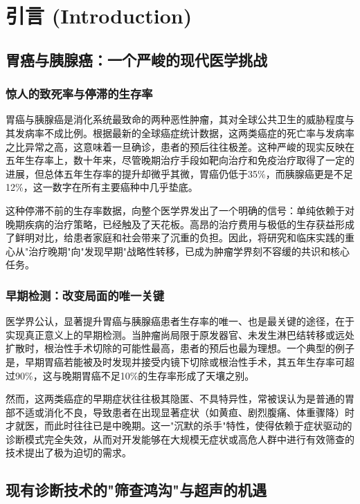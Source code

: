 
\chapter{引言 (Introduction)} \label{chp:intro}

\section{胃癌与胰腺癌：一个严峻的现代医学挑战}

\subsection{惊人的致死率与停滞的生存率}

胃癌与胰腺癌是消化系统最致命的两种恶性肿瘤，其对全球公共卫生的威胁程度与其发病率不成比例。根据最新的全球癌症统计数据，这两类癌症的死亡率与发病率之比异常之高，这意味着一旦确诊，患者的预后往往极差。这种严峻的现实反映在五年生存率上，数十年来，尽管晚期治疗手段如靶向治疗和免疫治疗取得了一定的进展，但总体五年生存率的提升却微乎其微，胃癌仍低于35\%，而胰腺癌更是不足12\%，这一数字在所有主要癌种中几乎垫底。

这种停滞不前的生存率数据，向整个医学界发出了一个明确的信号：单纯依赖于对晚期疾病的治疗策略，已经触及了天花板。高昂的治疗费用与极低的生存获益形成了鲜明对比，给患者家庭和社会带来了沉重的负担。因此，将研究和临床实践的重心从"治疗晚期"向"发现早期"战略性转移，已成为肿瘤学界刻不容缓的共识和核心任务。

\subsection{早期检测：改变局面的唯一关键}

医学界公认，显著提升胃癌与胰腺癌患者生存率的唯一、也是最关键的途径，在于实现真正意义上的早期检测。当肿瘤尚局限于原发器官、未发生淋巴结转移或远处扩散时，根治性手术切除的可能性最高，患者的预后也最为理想。一个典型的例子是，早期胃癌若能被及时发现并接受内镜下切除或根治性手术，其五年生存率可超过90\%，这与晚期胃癌不足10\%的生存率形成了天壤之别。

然而，这两类癌症的早期症状往往极其隐匿、不具特异性，常被误认为是普通的胃部不适或消化不良，导致患者在出现显著症状（如黄疸、剧烈腹痛、体重骤降）时才就医，而此时往往已是中晚期。这一"沉默的杀手"特性，使得依赖于症状驱动的诊断模式完全失效，从而对开发能够在大规模无症状或高危人群中进行有效筛查的技术提出了极为迫切的需求。

\section{现有诊断技术的"筛查鸿沟"与超声的机遇}

